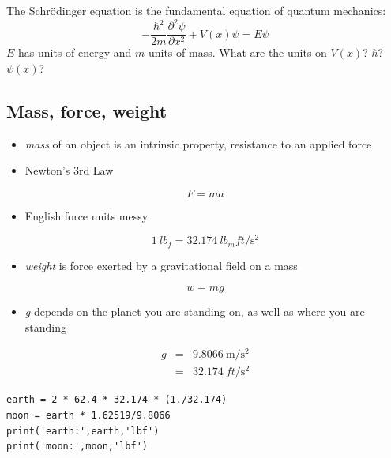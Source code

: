 \documentclass[11pt]{article}
\begin{document}
\begin{framed}
\noindent The Schr\"{o}dinger equation is the fundamental equation of quantum mechanics:
\begin{equation}
-\frac{\hbar^{2}}{2 m} \frac{\partial^{2}\psi}{\partial x^{2}} + V(x) \psi = E \psi
\end{equation}
\(E\) has units of energy and \(m\) units of mass.  What are the units on \(V(x)\)?  \(\hbar\)?  \(\psi(x)\)?
\end{framed}

\subsection{Mass, force, weight}
\label{sec-3-6}
\begin{itemize}
\item \emph{mass} of an object is an intrinsic property, resistance to an applied force
\item Newton's 3rd Law
\end{itemize}
\[\boxed{F = m a } \]
\begin{itemize}
\item English force units messy
\end{itemize}
\[\boxed{\SI{1}{lb_{f}}=\SI{32.174}{lb_{m} ft\per\s\squared}} \]
\begin{itemize}
\item \emph{weight} is force exerted by a gravitational field on a mass
\end{itemize}
\[ \boxed{w = m g} \]
\begin{itemize}
\item \emph{g} depends on the planet you are standing on, as well as where you are standing
\end{itemize}
\begin{eqnarray*}
g &= & \SI{9.8066}{\m\per\s\squared}\\
  & = & \SI{32.174}{ft\per\s\squared}
\end{eqnarray*}

\begin{verbatim}
earth = 2 * 62.4 * 32.174 * (1./32.174)
moon = earth * 1.62519/9.8066
print('earth:',earth,'lbf')
print('moon:',moon,'lbf')
\end{verbatim}
\end{document}
